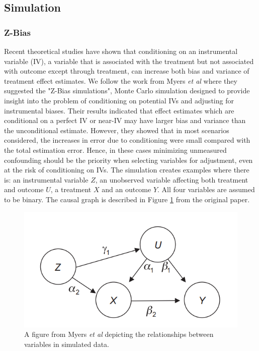 \documentclass{article}
\begin{document}
\subsection{Simulation}

\subsubsection{Z-Bias}
Recent theoretical studies have shown that conditioning on an instrumental variable (IV), a variable that is associated with the treatment but not associated with outcome except through treatment, can increase both bias and variance of treatment effect estimates. 
We follow the work from Myers \textit{et al} \cite{myers2011effects} where they suggested the "Z-Bias simulations", Monte Carlo simulation designed to provide insight into the problem of conditioning on potential IVs and adjusting for instrumental biases. 
Their results indicated that effect estimates which are conditional on a perfect IV or near-IV may have larger bias and variance than the unconditional estimate. However, they showed that in most scenarios considered, the increases in error due to conditioning were small compared with the total estimation error. Hence, in these cases minimizing unmeasured confounding should be the priority when selecting variables for adjustment, even at the risk of conditioning on IVs.
The simulation creates examples where there is: an instrumental variable $Z$, an unobserved variable affecting both treatment and outcome $U$, a treatment $X$ and an outcome $Y$. All four variables are assumed to be binary. The causal graph is described in Figure \ref{fig:z_bias_explanation} from the original paper.

\begin{figure}[H]
    \centering
    \includegraphics[width=\textwidth]{Paper/images/z_bias_schema_complex.png}
    \caption{A figure from Myers \textit{et al} depicting the relationships between variables in simulated data.}
    \label{fig:z_bias_explanation}
\end{figure} 
\end{document}
